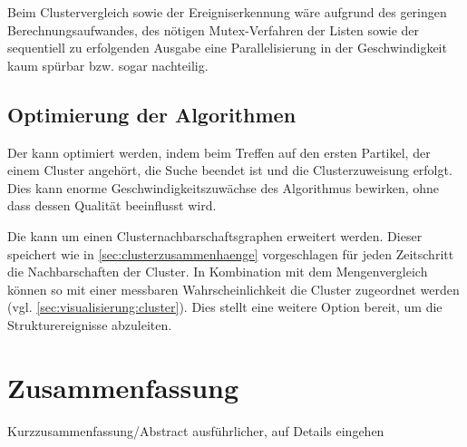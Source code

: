Beim Clustervergleich sowie der Ereigniserkennung wäre aufgrund des geringen Berechnungsaufwandes, des nötigen Mutex-Verfahren der Listen sowie der sequentiell zu erfolgenden Ausgabe eine Parallelisierung in der Geschwindigkeit kaum spürbar bzw. sogar nachteilig.



\section{Optimierung der Algorithmen}\label{sec:disc:optimierungAlg}
Der \CFD kann optimiert werden, indem beim Treffen auf den ersten Partikel, der einem Cluster angehört, die Suche beendet ist und die Clusterzuweisung erfolgt. Dies kann enorme Geschwindigkeitszuwächse des Algorithmus bewirken, ohne dass dessen Qualität beeinflusst wird.

Die \SECC kann um einen Clusternachbarschaftsgraphen erweitert werden. Dieser speichert wie in \autoref{sec:clusterzusammenhaenge} vorgeschlagen für jeden Zeitschritt die Nachbarschaften der Cluster. In Kombination mit dem Mengenvergleich können so mit einer messbaren Wahrscheinlichkeit die Cluster zugeordnet werden (vgl. \autoref{sec:visualisierung:cluster}). %
Dies stellt eine weitere Option bereit, um die Strukturereignisse abzuleiten.




\chapter{Zusammenfassung}
Kurzzusammenfassung/Abstract ausführlicher, auf Details eingehen







